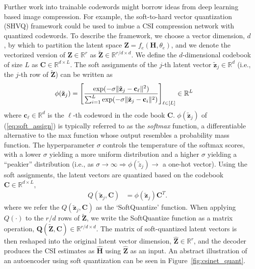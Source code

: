 Further work into trainable codewords might borrow ideas from deep learning based image compression. For example, the soft-to-hard vector quantization (SHVQ) framework \cite{ref:Agustsson2017SoftToHard} could be used to imbue a CSI compression network with quantized codewords. To describe the framework, we choose a vector dimension, $d$, by which to partition the latent space $\mathbf Z = f_e(\mathbf H, \theta_e)$, and we denote the vectorized version of $\mathbf Z \in \mathbb R^{r}$ as $\tilde{\mathbf Z} \in \mathbb R^{r/d \times d}$. We define the $d$-dimensional codebook of size $L$ as $\mathbf C \in \mathbb R^{d\times L}$. The soft assignments of the $j$-th latent vector $\tilde{\mathbf z}_j\in \mathbb{R}^{d}$ (i.e., the $j$-th row of $\tilde{\mathbf{Z}}$) can be written as
\begin{align}
\phi(\tilde{\mathbf z}_j) &= \left[\frac{\text{exp}(-\sigma \Arrowvert \tilde{\mathbf z}_j - \mathbf c_\ell\Arrowvert^2)}{\sum_{i=1}^L\text{exp}(-\sigma \Arrowvert \tilde{\mathbf z}_j - \mathbf c_i\Arrowvert^2)}\right]_{\ell\in [L]} \in \mathbb R^L \label{eq:soft_assign}
\end{align}
where $\mathbf{c}_{\ell}\in\mathbb{R}^{d}$ is the $\ell$-th codeword in the code book $\mathbf{C}$. $\phi(\tilde{\mathbf z}_j)$ of (\ref{eq:soft_assign}) is typically referred to as the \emph{softmax} function, a differentiable alternative to the max function whose output resembles a probability mass function. The hyperparameter $\sigma$ controls the temperature of the softmax scores, with a lower $\sigma$ yielding a more uniform distribution and a higher $\sigma$ yielding a ``peakier'' distribution (i.e., as $\sigma \to \infty \Rightarrow \phi(\tilde z_j) \to $ a one-hot vector). Using the soft assignments, the latent vectors are quantized based on the codebook $\mathbf C \in \mathbb R^{d \times L}$,
\begin{align}
Q(\tilde{\mathbf z}_j,\mathbf C) &= \phi(\tilde{\mathbf z}_j) \mathbf C^T. \label{eq:soft_quant}
\end{align}
where we refer the $Q(\tilde{\mathbf z}_j, \mathbf C)$ as the `SoftQuantize' function. When applying $Q(\cdot)$ to the $r/d$ rows of $\tilde{\mathbf Z}$, we write the SoftQuantize function as a matrix operation, $\mathbf Q(\tilde{\mathbf Z},\mathbf C) \in \mathbb R^{r/d \times d}$. The matrix of soft-quantized latent vectors is then reshaped into the original latent vector dimension, $\hat{\mathbf Z} \in \mathbb R^r$, and the decoder produces the CSI estimates as $\hat{\mathbf H}$ using $\hat{\mathbf{Z}}$ as an input. An abstract illustration of an autoencoder using soft quantization can be seen in Figure~\ref{fig:csinet_quant}.

